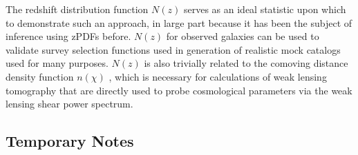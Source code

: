 \documentclass[preprint]{aastex}
\begin{document}
The redshift distribution function $N(z)$ serves as an ideal statistic upon 
which to demonstrate such an approach, in large part because it has been the 
subject of inference using zPDFs before.  \citep{she11, kel12, ben12, bon13, 
vii15}  $N(z)$ for observed galaxies can be used to validate survey selection 
functions used in generation of realistic mock catalogs used for many purposes. 
 \citep{nor01}  $N(z)$ is also trivially related to the comoving distance 
density function $n(\chi)$ \citep{hog99}, which is necessary for calculations 
of weak lensing tomography that are directly used to probe cosmological 
parameters via the weak lensing shear power spectrum.  \citep{mas15}

\clearpage
\subsection*{Temporary Notes}
\end{document}
